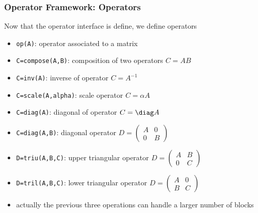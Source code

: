 \begin{frame}[fragile]
  \frametitle{Operator Framework: Operators}
  Now that the operator interface is define, we define operators
  \begin{itemize}
  \item \texttt{op(A)}: operator associated to a matrix
  \item \texttt{C=compose(A,B)}: composition of two operators
    $C=A B$
  \item \texttt{C=inv(A)}: inverse of operator $C=A^{-1}$
  \item \texttt{C=scale(A,alpha)}: scale operator $C=\alpha
    A$
  \item \texttt{C=diag(A)}: diagonal of operator $C=\diag A$
  \item \texttt{C=diag(A,B)}: diagonal operator $D=
    \begin{pmatrix}
      A & 0\\
      0 & B
    \end{pmatrix}
$
  \item \texttt{D=triu(A,B,C)}: upper triangular operator  $D=
    \begin{pmatrix}
      A & B\\
      0 & C
    \end{pmatrix}
$
\item \texttt{D=tril(A,B,C)}: lower triangular operator $D=
    \begin{pmatrix}
      A & 0\\
      B & C
    \end{pmatrix}
$
\item actually the previous three operations can handle a larger number of blocks
  \end{itemize}
\end{frame}

